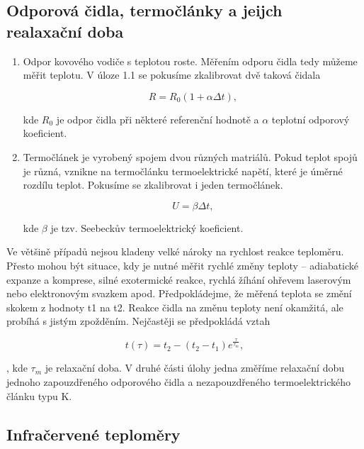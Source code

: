 \documentclass[a4paper,11pt]{article}
\begin{document}
\subsection{Odporová čidla, termočlánky a jeijch realaxační doba}

\begin{enumerate}
\item Odpor kovového vodiče s teplotou roste. Měřením odporu čidla tedy můžeme měřit teplotu. 
V úloze 1.1 se pokusíme zkalibrovat dvě taková čidala

\begin{equation}
R = R_0(1+\alpha \Delta t),
\end{equation}

kde $R_0$ je odpor čidla při některé referenční hodnotě a $\alpha$ teplotní odporový koeficient.  

\item Termočlánek je vyrobený spojem dvou různých matriálů. Pokud teplot spojů je různá, 
vznikne na termočlánku termoelektrické napětí, které je úměrné rozdílu teplot. Pokusíme se zkalibrovat i jeden termočlánek.

\begin{equation}
U=\beta\Delta t,
\end{equation}

kde $\beta$ je tzv. Seebeckův termoelektrický koeficient.
\end{enumerate}

Ve většině případů nejsou kladeny velké nároky na rychlost reakce teploměru. Přesto mohou být situace, kdy je
nutné měřit rychlé změny teploty – adiabatické expanze a komprese, silné exotermické reakce,
rychlá žíhání ohřevem laserovým nebo elektronovým svazkem apod.
Předpokládejme, že měřená teplota se změní skokem z hodnoty t1 na t2. Reakce čidla na změnu
teploty není okamžitá, ale probíhá s jistým zpožděním. Nejčastěji se předpokládá vztah

\begin{equation}
  t(\tau) = t_2 - (t_2-t_1)e^{\frac{\tau}{\tau_m}},
\end{equation}

, kde $\tau_m$ je relaxační doba. V druhé části úlohy jedna změříme relaxační dobu
jednoho zapouzdřeného odporového čidla a nezapouzdřeného termoelektrického článku typu K.

\subsection{Infračervené teploměry}
\end{document}
